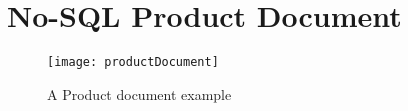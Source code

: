 \chapter{No-SQL Product Document} %
\label{productDoc}
\begin{figure}[H]
\centering
\texttt{[image: productDocument]}
\caption{A Product document example}
\end{figure}